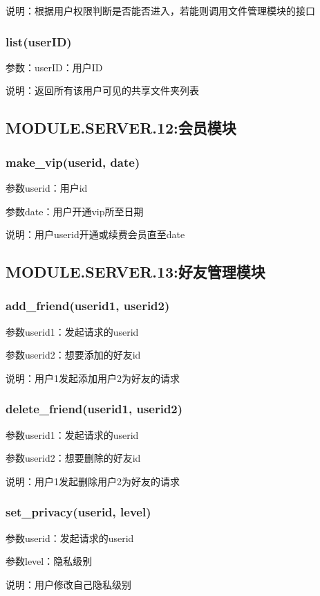 说明：根据用户权限判断是否能否进入，若能则调用文件管理模块的接口
 
\subsubsection{list(userID)}
参数：userID：用户ID

说明：返回所有该用户可见的共享文件夹列表


{
\color{red}
\subsection{MODULE.SERVER.12:会员模块}

\subsubsection{make\_vip(userid, date)}

参数userid：用户id

参数date：用户开通vip所至日期

说明：用户userid开通或续费会员直至date

\subsection{MODULE.SERVER.13:好友管理模块}

\subsubsection{add\_friend(userid1, userid2)}

参数userid1：发起请求的userid

参数userid2：想要添加的好友id

说明：用户1发起添加用户2为好友的请求

\subsubsection{delete\_friend(userid1, userid2)}

参数userid1：发起请求的userid

参数userid2：想要删除的好友id

说明：用户1发起删除用户2为好友的请求

\subsubsection{set\_privacy(userid, level)}

参数userid：发起请求的userid

参数level：隐私级别

说明：用户修改自己隐私级别

}
    
